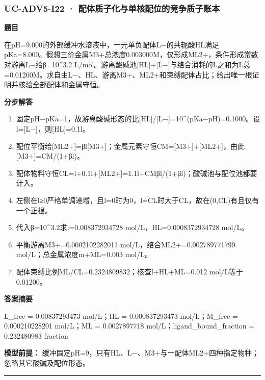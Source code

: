 \documentclass[UTF8,11pt,a4paper]{ctexart}
\begin{document}
\subsubsection*{UC-ADV5-I22 · 配体质子化与单核配位的竞争质子账本}
\noindent\textbf{题目}\par
在pH=9.000的外部缓冲水溶液中，一元单负配体L−的共轭酸HL满足pKa=8.000。假想三价金属M3+总浓度0.003000M，仅形成ML2+，条件形成常数对游离L−给β=10\textasciicircum{}3.2 L/mol。游离酸碱池[HL]+[L−]与络合消耗的L之和为L总=0.01200M。求自由L−、HL、游离M3+、ML2+和束缚配体占比；给出唯一根证明并核验全部配体和金属守恒。\par
\medskip\noindent\textbf{分步解答}
\begin{enumerate}
\item 固定pH−pKa=1，故游离酸碱形态的比[HL]/[L−]=10\textasciicircum{}(pKa−pH)=0.1000。设l=[L−]，则[HL]=0.1l。
\item 配位平衡给[ML2+]=βl[M3+]；金属元素守恒CM=[M3+]+[ML2+]，由此[M3+]=CM/(1+βl)。
\item 配体物料守恒CL=l+0.1l+[ML2+]=1.1l+CMβl/(1+βl)；酸碱池与配位池都要计入。
\item 左侧在l≥0严格单调递增，且l=0时为0，l=CL时大于CL，故在(0,CL)有且仅有一个正根。
\item 代入β=10\textasciicircum{}3.2求l=0.008372934728 mol/L，HL=0.0008372934728 mol/L。
\item 平衡游离M3+=0.0002102282011 mol/L，络合ML2+=0.002789771799 mol/L；总金属浓度m+ML=0.003 mol/L。
\item 配体束缚比例ML/CL=0.2324809832；核查l+HL+ML=0.012 mol/L等于0.01200。
\end{enumerate}
\noindent\textbf{答案摘要}\par
L\_free = 0.00837293473 mol/L；HL = 0.000837293473 mol/L；M\_free = 0.000210228201 mol/L；ML = 0.0027897718 mol/L；ligand\_bound\_fraction = 0.232480983 fraction\par
\noindent\textbf{模型前提：}
缓冲固定pH=9，只有HL、L−、M3+与一配体ML2+四种指定物种；忽略其它酸碱及配位形态。\par
\medskip\hrule\medskip
{}
\end{document}
